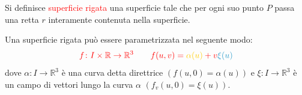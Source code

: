        \begin{definizione}
        \mbox{}

        Si definisce \textcolor{red}{superficie rigata} una superficie tale che per ogni suo punto $P$ passa una retta $r$ interamente contenuta nella superficie.

        Una superficie rigata può essere parametrizzata nel seguente modo:
        \begin{equation}
        \label{eq:superficie_rigata_param}
        \color{red} f \colon I \times \mathbb{R} \to \mathbb{R}^3 \qquad f(u,v) = \textcolor{amber}{\alpha(u)} + v \textcolor{celeste}{\xi(u)}
        \end{equation}
        dove \textcolor{amber}{$\alpha \colon I \to \mathbb{R}^3$} è una curva detta \textcolor{amber}{direttrice} \textcolor{blu}{$(f(u,0)=\alpha(u))$} e 
        \textcolor{celeste}{$\xi \colon I \to \mathbb{R}^3$} è un \textcolor{celeste}{campo di vettori} lungo la curva $\alpha$ \textcolor{blu}{$(f_v(u,0)=\xi(u))$}.
        \end{definizione}
